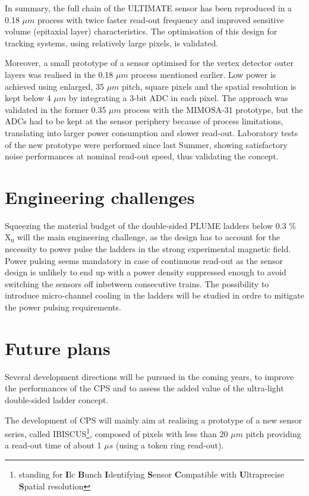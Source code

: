 \documentclass[11pt,a4paper,twosided]{article}
\begin{document}
  In summary, the full chain of the ULTIMATE sensor has been reproduced 
in a 0.18 $\mu m$ process with twice faster read-out frequency and 
improved sensitive volume (epitaxial layer) characteristics. The 
optimisation of this design for tracking systems, using relatively 
large pixels, is validated.

  Moreover, a small prototype of a sensor optimised for the vertex detector 
outer layers was realised in the 0.18 $\mu m$ process mentioned earlier. 
Low power is achieved using enlarged, 35 $\mu m$ pitch, square pixels and the 
spatial resolution is kept below 4 $\mu m$ by integrating a 3-bit ADC in
each pixel. The approach was validated in the former 0.35 $\mu m$ process 
with the MIMOSA-31 prototype, but the ADCs had to be kept at the sensor 
periphery because of process limitations, translating into larger 
power consumption and slower read-out. Laboratory tests of the new 
prototype were performed since last Summer, showing satisfactory noise performances at nominal read-out speed, thus validating the concept. 



\section{Engineering challenges}

  Squeezing the material budget of the double-sided PLUME ladders 
below 0.3 \% X$_0$ will the main engineering challenge, as the design 
has to account for the necessity to power pulse the ladders in the 
strong experimental magnetic field. Power pulsing seems mandatory 
in case of continuous read-out as the sensor design is unlikely to 
end up with a power density suppressed enough to avoid switching 
the sensors off inbetween consecutive trains. The possibility to 
introduce micro-channel cooling in the ladders will be studied in
ordre to mitigate the power pulsing requirements.



\section{Future plans}

  Several development directions will be pursued in the coming years,
to improve the performances of the CPS and to assess the added value 
of the ultra-light double-sided ladder concept.

  The development of CPS will mainly aim at realising a prototype of 
a new sensor series, called IBISCUS\footnote{standing for {\bf I}lc 
{\bf B}unch {\bf I}dentifying {\bf S}ensor {\bf C}ompatible with 
{\bf U}ltraprecise {\bf S}patial resolution}, 
composed of pixels with less than 20 $\mu m$ pitch providing a 
read-out time of about 1 $\mu s$ (using a token ring read-out).   
\end{document}
